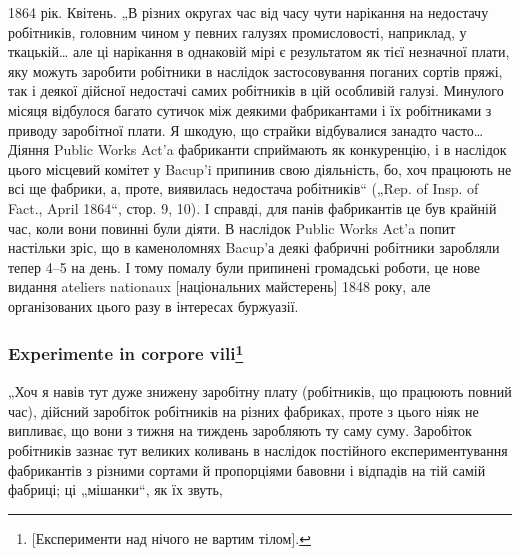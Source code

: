 1864 рік. Квітень. „В різних округах час від часу чути нарікання
на недостачу робітників, головним чином у певних галузях
промисловості, наприклад, у ткацькій\dots{} але ці нарікання в однаковій
мірі є результатом як тієї незначної плати, яку можуть заробити
робітники в наслідок застосовування поганих сортів пряжі,
так і деякої дійсної недостачі самих робітників в цій особливій
галузі. Минулого місяця відбулося багато сутичок між деякими
фабрикантами і їх робітниками з приводу заробітної плати.
Я шкодую, що страйки відбувалися занадто часто\dots{} Діяння
Public Works Act’a фабриканти сприймають як конкуренцію,
і в наслідок цього місцевий комітет у Bacup’i припинив свою
діяльність, бо, хоч працюють не всі ще фабрики, а, проте, виявилась
недостача робітників“ („Rep. of Insp. of Fact., April 1864“,
стор. 9, 10). І справді, для панів фабрикантів це був крайній
час, коли вони повинні були діяти. В наслідок Public Works
Act’a попит настільки зріс, що в каменоломнях Bacup’а деякі
фабричні робітники заробляли тепер 4--5 на день.
І тому помалу були припинені громадські роботи, це нове видання
ateliers nationaux [національних майстерень] 1848 року,
але організованих цього разу в інтересах буржуазії.

\subsubsection{Experimente in corpore vili\footnote*{
[Експерименти над нічого не вартим тілом].
}}

„Хоч я навів тут дуже знижену заробітну плату (робітників,
що працюють повний час), дійсний заробіток робітників на
різних фабриках, проте з цього ніяк не випливає, що вони
з тижня на тиждень заробляють ту саму суму. Заробіток робітників
зазнає тут великих коливань в наслідок постійного експериментування
фабрикантів з різними сортами й пропорціями бавовни
і відпадів на тій самій фабриці; ці „мішанки“, як їх звуть,
\parbreak{}  %
